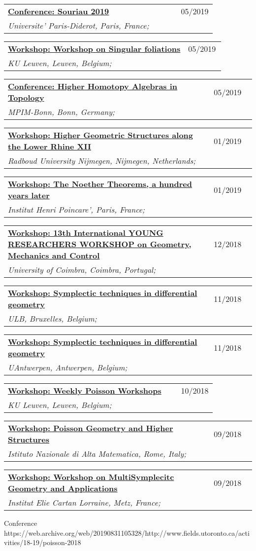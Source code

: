 \documentclass[a4paper]{article}
\newcommand{\longvoice}[8]{
	\begin{tabular}{p{0.83\linewidth} p{0.17\linewidth} }
		\textbf{\href{#3}{#2: #1}} & #4 
		\\ 
		\textit{#5, #6, #7;} & {\small\emph{#8}}
	\end{tabular}
	\vspace{.5em}
}
\begin{document}
		{}
	\longvoice{Souriau 2019}
		{Conference}
		{https://web.archive.org/web/20190831102558/http://souriau2019.fr/?page_id=2}
		{05/2019}
		{Universite' Paris-Diderot}
		{Paris}
		{France}
		{}
	\longvoice{Workshop on Singular foliations}
		{Workshop}
		{https://wis.kuleuven.be/agenda/sem-geometry/sem-geometry-upcoming}
		{05/2019}
		{KU Leuven}
		{Leuven}
		{Belgium}
		{}
	\longvoice{Higher Homotopy Algebras in Topology}
		{Conference}
		{https://web.archive.org/web/20190831103619/https://www.mpim-bonn.mpg.de/node/9245}
		{05/2019}
		{MPIM-Bonn}
		{Bonn}
		{Germany}
		{}
	\longvoice{Higher Geometric Structures along the Lower Rhine XII}
		{Workshop}
		{https://web.archive.org/web/20190831103524/https://www.math.ru.nl/~sagave/higher-structures-XII/}
		{01/2019}
		{Radboud University Nijmegen}
		{Nijmegen}
		{Netherlands}
		{}
	\longvoice{The Noether Theorems, a hundred years later}
		{Workshop}
		{https://web.archive.org/web/20190831105634/http://noether.iecl.univ-lorraine.fr/noether_en.html}
		{01/2019}
		{Institut Henri Poincare'}
		{Paris}
		{France}
		{}
	\longvoice{13th International YOUNG RESEARCHERS WORKSHOP on Geometry, Mechanics and Control}
		{Workshop}
		{https://web.archive.org/web/20190831103121/http://www.uc.pt/en/congressos/13yrw/programa}
		{12/2018}
		{University of Coimbra}
		{Coimbra}
		{Portugal}
		{}
	\longvoice{Symplectic techniques in differential geometry}
		{Workshop}
		{https://www.uantwerpen.be/nl/personeel/sonja-hohloch/private-webpage/excellence-of-scienc/minicourses/}
		{11/2018}
		{ULB}
		{Bruxelles}
		{Belgium}
		{}
	\longvoice{Symplectic techniques in differential geometry}
		{Workshop}
		{https://www.uantwerpen.be/nl/personeel/sonja-hohloch/private-webpage/excellence-of-scienc/minicourses/}
		{11/2018}
		{UAntwerpen}
		{Antwerpen}
		{Belgium}
		{}
	\longvoice{Weekly Poisson Workshops}
		{Workshop}
		{https://wis.kuleuven.be/meetkunde/PoissonWorkingGroup}
		{10/2018}
		{KU Leuven}
		{Leuven}
		{Belgium}
		{}
	\longvoice{Poisson Geometry and Higher Structures}
		{Workshop}
		{https://web.archive.org/web/20190831103317/http://www1.mat.uniroma1.it/ricerca/convegni/2018/hippo2018/index.html}
		{09/2018}
		{Istituto Nazionale di Alta Matematica}
		{Rome}
		{Italy}
		{}
	\longvoice{Workshop on MultiSymplecitc Geometry and Applications}
		{Workshop}
		{https://web.archive.org/web/20180704152639/http://www.math.univ-metz.fr/~wurzbacher/GEMSA.html}
		{09/2018}
		{Institut Elie Cartan Lorraine}
		{Metz}
		{France}
		{}
		{Conference}
		{https://web.archive.org/web/20190831105328/http://www.fields.utoronto.ca/activities/18-19/poisson-2018}
\end{document}
